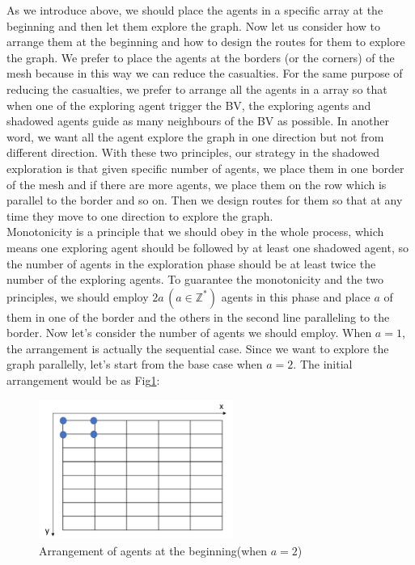 As we introduce above, we should place the agents in a specific array at the beginning and then let them explore the graph. Now let us consider how to arrange them at the beginning and how to design the routes for them to explore the graph. We prefer to place the agents at the borders (or the corners) of the mesh because in this way we can reduce the casualties. For the same purpose of reducing the casualties, we prefer to arrange all the agents in a array so that when one of the exploring agent trigger the BV, the exploring agents and shadowed agents guide as many neighbours of the BV as possible. In another word, we want all the agent explore the graph in one direction but not from different direction. With these two principles, our strategy in the shadowed exploration is that given specific number of agents, we place them in one border of the mesh and if there are more agents, we place them on the row which is parallel to the border and so on. Then we design routes for them so that at any time they move to one direction to explore the graph. \\
Monotonicity is a principle that we should obey in the whole process, which means one exploring agent should be followed by at least one shadowed agent, so the number of agents in the exploration phase should be at least twice the number of the exploring agents. To guarantee the monotonicity and the two principles, we should employ $2a\,(a\in\mathbb{Z}^*)$ agents in this phase and place $a$ of them in one of the border and the others in the second line paralleling to the border.
Now let's consider the number of agents we should employ.
When $a=1$, the arrangement is actually the sequential case. Since we want to explore the graph parallelly, let's start from the base case when $a=2$. The initial arrangement would be as Fig\ref{fig:twoagent1}:
\begin{figure}[H]
  \centering  
  \includegraphics[width=2.5in]{figures/twoagent1.png}
  \caption{Arrangement of agents at the beginning(when $a=2$)}\label{fig:twoagent1}
\end{figure}

